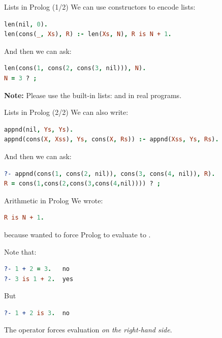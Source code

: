 \begin{frame}[fragile]{Lists in Prolog (1/2)}
We can use constructors to encode lists:

\begin{lstlisting}[language=prolog, xleftmargin=0.5cm]
len(nil, 0).
len(cons(_, Xs), R) :- len(Xs, N), R is N + 1.
\end{lstlisting}

\pause

And then we can ask:

\begin{lstlisting}[language=prolog, xleftmargin=0.5cm]
len(cons(1, cons(2, cons(3, nil))), N).
N = 3 ? ;
\end{lstlisting}

\pause

\textbf{Note:} Please use the built-in lists: \Code{[]} and 
in real programs. 
\end{frame}

\begin{frame}[fragile]{Lists in Prolog (2/2)}
We can also write:

\begin{lstlisting}[language=prolog, xleftmargin=0.5cm]
appnd(nil, Ys, Ys).
appnd(cons(X, Xss), Ys, cons(X, Rs)) :- appnd(Xss, Ys, Rs).
\end{lstlisting}

\pause

And then we can ask:

\begin{lstlisting}[language=prolog, xleftmargin=0.5cm]
?- appnd(cons(1, cons(2, nil)), cons(3, cons(4, nil)), R).
R = cons(1,cons(2,cons(3,cons(4,nil)))) ? ;
\end{lstlisting}
\end{frame}

\begin{frame}[fragile]{Arithmetic in Prolog}
We wrote:

\begin{lstlisting}[language=prolog, xleftmargin=0.5cm]
R is N + 1.
\end{lstlisting}

because wanted to force Prolog to evaluate  to . 

Note that:

\begin{lstlisting}[language=prolog, xleftmargin=0.5cm]
?- 1 + 2 = 3.   no
?- 3 is 1 + 2.  yes
\end{lstlisting}

\pause

But

\begin{lstlisting}[language=prolog, xleftmargin=0.5cm]
?- 1 + 2 is 3.  no
\end{lstlisting}

The  operator forces evaluation \emph{on the right-hand side}.

\end{frame}

